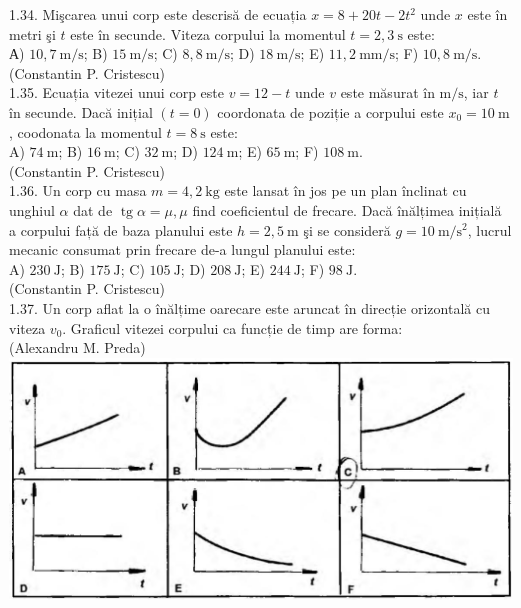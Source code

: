 \documentclass[10pt]{article}
\begin{document}
1.34. Mişcarea unui corp este descrisă de ecuația $x=8+20 t-2 t^{2}$ unde $x$ este în metri şi $t$ este în secunde. Viteza corpului la momentul $t=2,3 \mathrm{~s}$ este:\\ А) $10,7 \mathrm{~m} / \mathrm{s}$; B) $15 \mathrm{~m} / \mathrm{s}$; C) $8,8 \mathrm{~m} / \mathrm{s}$; D) $18 \mathrm{~m} / \mathrm{s}$; E) $11,2 \mathrm{~mm} / \mathrm{s}$; F) $10,8 \mathrm{~m} / \mathrm{s}$.\\ (Constantin P. Cristescu)\\

1.35. Ecuația vitezei unui corp este $v=12-t$ unde $v$ este măsurat în $\mathrm{m} / \mathrm{s}$, iar $t$ în secunde. Dacă inițial $(t=0)$ coordonata de poziție a corpului este $x_{0}=10 \mathrm{~m}$, coodonata la momentul $t=8 \mathrm{~s}$ este:\\ A) $74 \mathrm{~m}$; B) $16 \mathrm{~m}$; C) $32 \mathrm{~m}$; D) $124 \mathrm{~m}$; E) $65 \mathrm{~m}$; F) $108 \mathrm{~m}$.\\ (Constantin P. Cristescu)\\

1.36. Un corp cu masa $m=4,2 \mathrm{~kg}$ este lansat în jos pe un plan înclinat cu unghiul $\alpha$ dat de $\operatorname{tg} \alpha=\mu, \mu$ find coeficientul de frecare. Dacă înălțimea inițială a corpului față de baza planului este $h=2,5 \mathrm{~m}$ şi se consideră $g=10 \mathrm{~m} / \mathrm{s}^{2}$, lucrul mecanic consumat prin frecare de-a lungul planului este:\\ A) $230 \mathrm{~J}$; B) $175 \mathrm{~J}$; C) $105 \mathrm{~J}$; D) $208 \mathrm{~J}$; E) $244 \mathrm{~J}$; F) $98 \mathrm{~J}$.\\ (Constantin P. Cristescu)\\

1.37. Un corp aflat la o înălțime oarecare este aruncat în direcție orizontală cu viteza $v_{0}$. Graficul vitezei corpului ca funcție de timp are forma:\\ (Alexandru M. Preda)\\ \includegraphics[max width=\textwidth, center]{2025_07_01_5b3ff9fa0d508c8e9f17g-010(2)}\\
\end{document}
